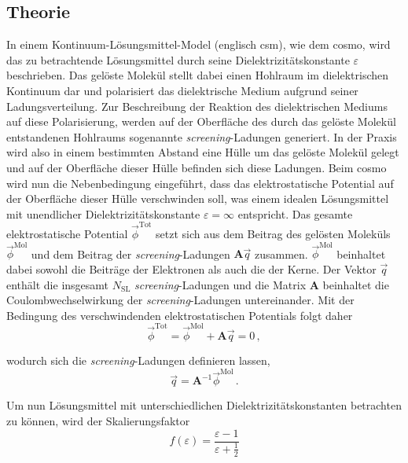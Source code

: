 	\subsection{Theorie}\label{kap:cosmotheo}
	In einem Kontinuum-Lösungsmittel-Model (englisch \ac{csm}), wie dem \ac{cosmo}, wird das zu betrachtende Lösungsmittel durch seine Dielektrizitätskonstante $\varepsilon$ beschrieben. Das gelöste Molekül stellt dabei einen Hohlraum im dielektrischen Kontinuum dar und polarisiert das dielektrische Medium aufgrund seiner Ladungsverteilung. Zur Beschreibung der Reaktion des dielektrischen Mediums auf diese Polarisierung, werden auf der Oberfläche des durch das gelöste Molekül entstandenen Hohlraums sogenannte \textit{screening}-Ladungen generiert. In der Praxis wird also in einem bestimmten Abstand eine Hülle um das gelöste Molekül gelegt und auf der Oberfläche dieser Hülle befinden sich diese Ladungen. Beim \ac{cosmo} wird nun die Nebenbedingung eingeführt, dass das elektrostatische Potential auf der Oberfläche dieser Hülle verschwinden soll, was einem idealen Lösungsmittel mit unendlicher Dielektrizitätskonstante $\varepsilon=\infty$ entspricht. Das gesamte elektrostatische Potential $\vec{\phi}^{\textrm{Tot}}$ setzt sich aus dem Beitrag des gelösten Moleküls $\vec{\phi}^{\textrm{Mol}}$ und dem Beitrag der \textit{screening}-Ladungen $\boldsymbol{A}\vec{q}$ zusammen. $\vec{\phi}^{\textrm{Mol}}$ beinhaltet dabei sowohl die Beiträge der Elektronen als auch die der Kerne. Der Vektor $\vec{q}$ enthält die insgesamt $N_{\textrm{SL}}$ \textit{screening}-Ladungen und die Matrix $\boldsymbol{A}$ beinhaltet die Coulombwechselwirkung der \textit{screening}-Ladungen untereinander. Mit der Bedingung des verschwindenden elektrostatischen Potentials folgt daher
	\begin{equation}
	\vec{\phi}^{\textrm{Tot}}=\vec{\phi}^{\textrm{Mol}}+\boldsymbol{A}\vec{q}=0\, ,
	\end{equation}
	
wodurch sich die \textit{screening}-Ladungen definieren lassen,
	\begin{equation}
	\vec{q}=\boldsymbol{A}^{-1}\vec{\phi}^{\textrm{Mol}}\, .
	\end{equation}
	
Um nun Lösungsmittel mit unterschiedlichen Dielektrizitätskonstanten betrachten zu können, wird der Skalierungsfaktor 
	\begin{equation}
	f(\varepsilon)=\frac{\varepsilon-1}{\varepsilon+\frac{1}{2}}
	\end{equation}
	

